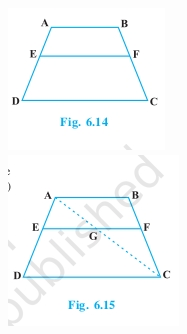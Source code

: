 \documentclass[a4paper,12pt]{article}
\begin{document}
\begin{minipage}{0.45\textwidth}
\centering
\vspace{-5em}
\includegraphics[width=\linewidth]{fig614.jpg}\\
\vspace{-5em}
\includegraphics[width=\linewidth]{fig615.jpg}\\
\end{minipage}
\end{document}
